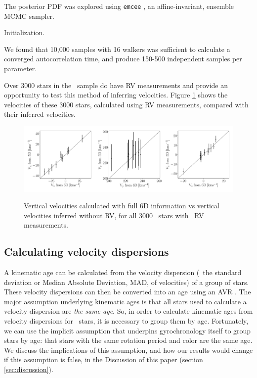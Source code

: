 The posterior PDF was explored using {\tt emcee} \citep{foreman-mackey2013},
an affine-invariant, ensemble MCMC sampler.

Initialization.

We found that 10,000 samples with 16 walkers was sufficient to calculate a
converged autocorrelation time, and produce 150-500 independent samples per
parameter.

Over 3000 stars in the \mct\ sample do have RV measurements and provide an
opportunity to test this method of inferring velocities.
Figure \ref{fig:v_comparison} shows the velocities of these 3000 stars,
calculated using RV measurements, compared with their inferred velocities.

\begin{figure}[ht!]
\caption{Vertical velocities calculated with full 6D information vs vertical
    velocities inferred without RV, for all 3000 \mct\ stars with \gaia\ RV
    measurements.}
  \centering
    \includegraphics[width=1\textwidth]{v_comparison}
\label{fig:v_comparison}
\end{figure}

\subsection{Calculating velocity dispersions}
\label{sec:velocity_dispersion}

A kinematic age can be calculated from the velocity dispersion (\eg\ the
standard deviation or Median Absolute Deviation, MAD, of velocities) of a
group of stars.
These velocity dispersions can then be converted into an age using an AVR
\citep[\eg][]{holmberg2009, yu2018}.
The major assumption underlying kinematic ages is that all stars used to
calculate a velocity dispersion are {\it the same age}.
So, in order to calculate kinematic ages from velocity dispersions for
\kepler\ stars, it is necessary to group them by age.
Fortunately, we can use the implicit assumption that underpins gyrochronology
itself to group stars by age: that stars with the same rotation period and
color are the same age.
We discuss the implications of this assumption, and how our results would
change if this assumption is false, in the Discussion of this paper (section
\ref{sec:discussion}).

